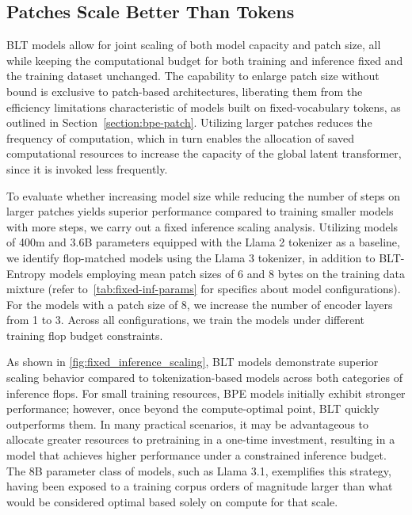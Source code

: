 \subsection{Patches Scale Better Than Tokens} {\textsc BLT} models allow for joint scaling of both model capacity and patch size, all while keeping the computational budget for both training and inference fixed and the training dataset unchanged. The capability to enlarge patch size without bound is exclusive to patch-based architectures, liberating them from the efficiency limitations characteristic of models built on fixed-vocabulary tokens, as outlined in Section~\ref{section:bpe-patch}. Utilizing larger patches reduces the frequency of computation, which in turn enables the allocation of saved computational resources to increase the capacity of the global latent transformer, since it is invoked less frequently.

To evaluate whether increasing model size while reducing the number of steps on larger patches yields superior performance compared to training smaller models with more steps, we carry out a fixed inference scaling analysis. Utilizing models of 400m and 3.6B parameters equipped with the Llama 2 tokenizer as a baseline, we identify flop-matched models using the Llama 3 tokenizer, in addition to {\textsc BLT}-Entropy models employing mean patch sizes of 6 and 8 bytes on the training data mixture (refer to~\autoref{tab:fixed-inf-params} for specifics about model configurations). For the models with a patch size of 8, we increase the number of encoder layers from 1 to 3. Across all configurations, we train the models under different training flop budget constraints.

As shown in \autoref{fig:fixed_inference_scaling}, {\textsc BLT} models demonstrate superior scaling behavior compared to tokenization-based models across both categories of inference flops. For small training resources, BPE models initially exhibit stronger performance; however, once beyond the compute-optimal point, {\textsc BLT} quickly outperforms them. In many practical scenarios, it may be advantageous to allocate greater resources to pretraining in a one-time investment, resulting in a model that achieves higher performance under a constrained inference budget. The 8B parameter class of models, such as Llama 3.1, exemplifies this strategy, having been exposed to a training corpus orders of magnitude larger than what would be considered optimal based solely on compute for that scale.

